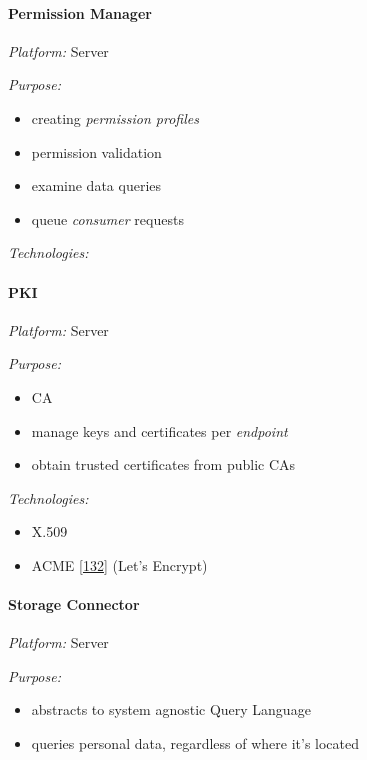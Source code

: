 \documentclass[12pt,english,a4paper,titlepage,cleardoublepage=empty,dottedtoc]{report}
\providecommand{\tightlist}{%
  \setlength{\itemsep}{0pt}\setlength{\parskip}{0pt}}
\begin{document}
\paragraph{Permission Manager}\label{permission-manager}

\emph{Platform:} Server

\emph{Purpose:}

\begin{itemize}
\tightlist
\item
  creating \emph{permission profiles}
\item
  permission validation
\item
  examine data queries
\item
  queue \emph{consumer} requests
\end{itemize}

\emph{Technologies:}

\paragraph{PKI}\label{pki}

\emph{Platform:} Server

\emph{Purpose:}

\begin{itemize}
\tightlist
\item
  CA
\item
  manage keys and certificates per \emph{endpoint}
\item
  obtain trusted certificates from public CAs
\end{itemize}

\emph{Technologies:}

\begin{itemize}
\tightlist
\item
  X.509
\item
  ACME {[}\protect\hyperlink{ref-web_spec_acme}{132}{]} (Let's Encrypt)
\end{itemize}

\paragraph{Storage Connector}\label{storage-connector}

\emph{Platform:} Server

\emph{Purpose:}

\begin{itemize}
\tightlist
\item
  abstracts to system agnostic Query Language
\item
  queries personal data, regardless of where it's located
\end{itemize}
\end{document}

